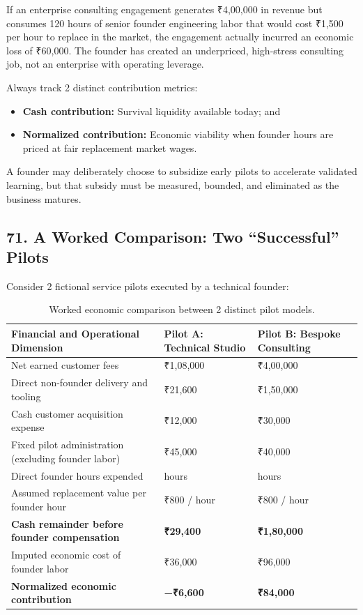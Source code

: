 If an enterprise consulting engagement generates ₹4,00,000 in revenue but consumes 120 hours of senior founder engineering labor that would cost ₹1,500 per hour to replace in the market, the engagement actually incurred an economic loss of ₹60,000. The founder has created an underpriced, high-stress consulting job, not an enterprise with operating leverage.

Always track 2 distinct contribution metrics:
\begin{itemize}
    \item \textbf{Cash contribution:} Survival liquidity available today; and
    \item \textbf{Normalized contribution:} Economic viability when founder hours are priced at fair replacement market wages.
\end{itemize}

A founder may deliberately choose to subsidize early pilots to accelerate validated learning, but that subsidy must be measured, bounded, and eliminated as the business matures.

\subsection*{71. A Worked Comparison: Two ``Successful'' Pilots}

Consider 2 fictional service pilots executed by a technical founder:

\begin{table}[t]
\centering
\small
\begin{tabularx}{\textwidth}{>{\raggedright\arraybackslash}p{6cm} >{\raggedleft\arraybackslash}X >{\raggedleft\arraybackslash}X}
\toprule
\textbf{Financial and Operational Dimension} & \textbf{Pilot A: Technical Studio} & \textbf{Pilot B: Bespoke Consulting} \\
\midrule
Net earned customer fees & ₹1,08,000 & ₹4,00,000 \\
Direct non-founder delivery and tooling & ₹21,600 & ₹1,50,000 \\
Cash customer acquisition expense & ₹12,000 & ₹30,000 \\
Fixed pilot administration (excluding founder labor) & ₹45,000 & ₹40,000 \\
Direct founder hours expended & 45 hours & 120 hours \\
Assumed replacement value per founder hour & ₹800 / hour & ₹800 / hour \\
\midrule
\textbf{Cash remainder before founder compensation} & \textbf{₹29,400} & \textbf{₹1,80,000} \\
Imputed economic cost of founder labor & ₹36,000 & ₹96,000 \\
\midrule
\textbf{Normalized economic contribution} & \textbf{−₹6,600} & \textbf{₹84,000} \\
\bottomrule
\end{tabularx}
\caption{Worked economic comparison between 2 distinct pilot models.}
\label{tab:ch9-pilot-comparison}
\end{table}

